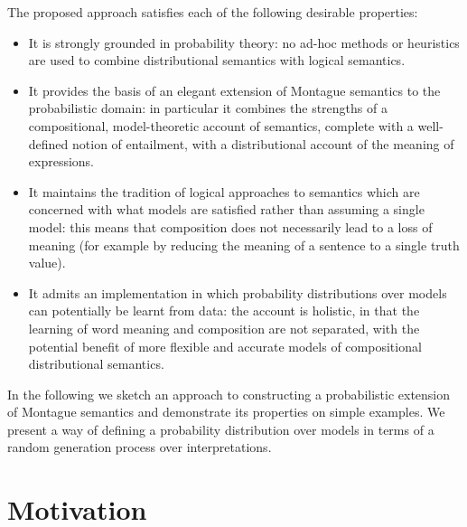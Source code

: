 \documentclass{svmult}
\begin{document}

The proposed approach satisfies each of the following desirable properties:
\begin{itemize}
\item It is strongly grounded in probability theory: no ad-hoc methods
  or heuristics are used to combine distributional semantics with
  logical semantics.
\item It provides the basis of an elegant extension of Montague
  semantics to the probabilistic domain: in particular it combines the
  strengths of a compositional, model-theoretic account of semantics,
  complete with a well-defined notion of entailment, with a
  distributional account of the meaning of expressions.
\item It maintains the tradition of logical approaches to semantics
  which are concerned with what models are satisfied rather than
  assuming a single model: this means that composition does not
  necessarily lead to a loss of meaning (for example by reducing the meaning of a
  sentence to a single truth value).
\item It admits an implementation in which probability distributions
  over models can potentially be learnt from data: the account is
  holistic, in that the learning of word meaning and composition are not
  separated, with the potential benefit of more flexible and accurate
  models of compositional distributional semantics.
\end{itemize}

In the following we sketch an approach to constructing a probabilistic
extension of Montague semantics and demonstrate its properties on
simple examples. We present a way of defining a probability
distribution over models in terms of  a random generation process over
interpretations.



\section{Motivation}
\end{document}
